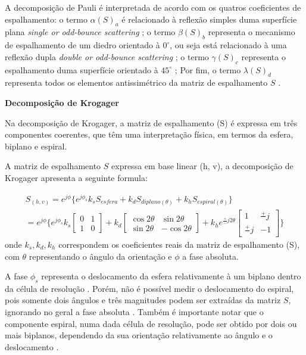 \documentclass[a4paper,12pt]{article}
\begin{document}
A decomposição de Pauli é interpretada de acordo com os quatros coeficientes de espalhamento: o termo $\alpha (S)_{a}$ é relacionado à reflexão simples duma superfície plana \textit{single or odd-bounce scattering} \cite{jong:2009}; o termo $\beta (S)_{b}$ representa o mecanismo de espalhamento de um diedro orientado à $0^{\circ}$, ou seja está relacionado à uma reflexão dupla \textit{double or odd-bounce scattering} \cite{nilosergio2012}; o termo $\gamma (S)_{c}$ representa o espalhamento duma superfície orientado à $45^{\circ}$ \cite{jong:2009}; Por fim, o termo $\lambda (S)_{d}$ representa todos os elementos antissimétrico da matriz de espalhamento $S$ \cite{jong:2009}.

\textbf{Decomposição de Krogager}

Na decomposição de Krogager, a matriz de espalhamento (S) é expressa em três componentes coerentes, que têm uma interpretação física, em termos da esfera, biplano e espiral\cite{jong:2009}.

A matriz de espalhamento $S$ expressa em base linear (h, v), a decomposição de Krogager apresenta a seguinte formula:

\begin{multline}
    S_{(h, v)} = e^{j\phi} \{e^{j\phi_s}k_sS_{esfera}+k_dS_{diplano(\theta)}+k_hS_{espiral(\theta)}\} \\
    =e^{j\phi} \Big\{ e^{j\phi_s}k_s \begin{bmatrix}
    	0 & 1 \\
    	1 & 0
	\end{bmatrix}+k_d \begin{bmatrix}
    	\cos{2\theta} & \sin{2\theta} \\
    	\sin{2\theta} & -\cos{2\theta}
	\end{bmatrix}+k_he^{\frac{+}{-}j2\theta} \begin{bmatrix}
    	1 & \frac{+}{}j \\
    	\frac{+}{}j & -1
	\end{bmatrix} \Big\}
\end{multline}
onde $k_{s}, k_{d}, k_{h}$ correspondem os coeficientes reais da matriz de espalhamento (S), com $\theta$ representando o ângulo da orientação e $\phi$ a fase absoluta.

A fase $\phi_{s}$ representa o deslocamento da esfera relativamente à um biplano dentro da célula de resolução \cite{jong:2009}. Porém, não é possível medir o deslocamento do espiral, pois somente dois ângulos e três magnitudes podem ser extraídas da matriz $S$, ignorando no geral a fase absoluta \cite{jong:2009}. Também é importante notar que o componente espiral, numa dada célula de resolução, pode ser obtido por dois ou mais biplanos, dependendo da sua orientação relativamente ao ângulo e o deslocamento \cite{jong:2009}.
\end{document}

